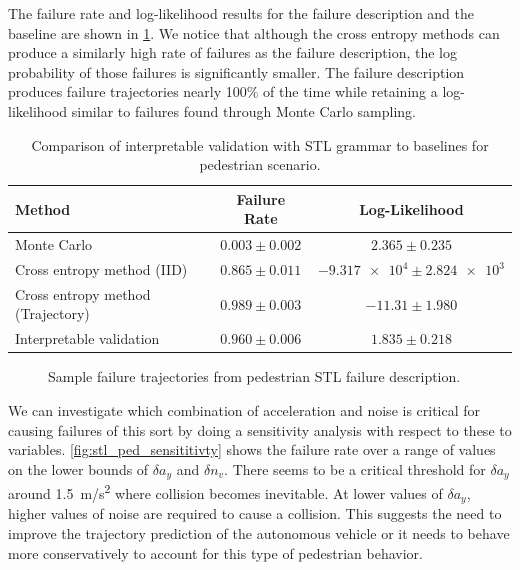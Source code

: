 The failure rate and log-likelihood results for the failure description and the baseline are shown in \cref{tab:ped_results_stl}.  We notice that although the cross entropy methods can produce a similarly high rate of failures as the failure description, the log probability of those failures is significantly smaller. The failure description produces failure trajectories nearly 100\% of the time while retaining a log-likelihood similar to failures found through Monte Carlo sampling. 

\begin{table}
    \centering
    \caption{Comparison of interpretable validation with STL grammar to baselines for pedestrian scenario.}
    \label{tab:ped_results_stl}
    \begin{tabular}{@{}lcc@{}} 
        \toprule
        \textbf{Method} & \textbf{Failure Rate} & \textbf{Log-Likelihood} \\
        \midrule
        Monte Carlo & $0.003 \pm 0.002$ & \phantom{$-$}$2.365 \pm 0.235$  \\
        Cross entropy method (IID) & $0.865 \pm 0.011$ & $\num{-9.317e4} \pm \num{2.824e3}$\\
        Cross entropy method (Trajectory) & $0.989 \pm 0.003$ & $-11.31 \pm 1.980$ \\
        Interpretable validation & $0.960 \pm 0.006$ & \phantom{$-$}$1.835 \pm 0.218$ \\
        \bottomrule
    \end{tabular}
\end{table}

\begin{figure}
    
    \caption{Sample failure trajectories from pedestrian STL failure description.}
    \label{fig:ped_stl_sample_failures}
\end{figure}

We can investigate which combination of acceleration and noise is critical for causing failures of this sort by doing a sensitivity analysis with respect to these to variables. \cref{fig:stl_ped_sensititivty} shows the failure rate over a range of values on the lower bounds of $\delta a_y$ and $\delta n_v$. There seems to be a critical threshold for $\delta a_y$ around \SI{1.5}{m/s^2} where collision becomes inevitable. At lower values of $\delta a_y$, higher values of noise are required to cause a collision. This suggests the need to improve the trajectory prediction of the autonomous vehicle or it needs to behave more conservatively to account for this type of pedestrian behavior. 

